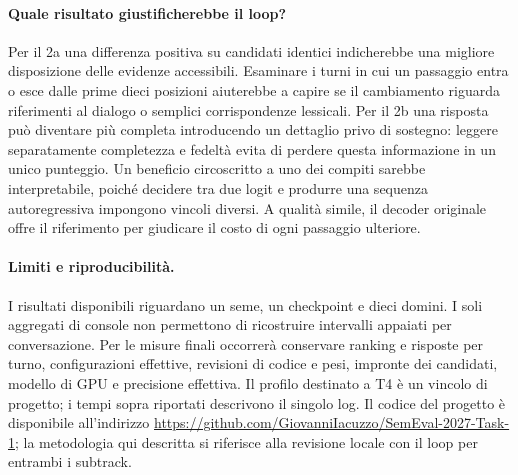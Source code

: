 \paragraph{Quale risultato giustificherebbe il loop?}
Per il 2a una differenza positiva su candidati identici indicherebbe una migliore disposizione delle evidenze accessibili. Esaminare i turni in cui un passaggio entra o esce dalle prime dieci posizioni aiuterebbe a capire se il cambiamento riguarda riferimenti al dialogo o semplici corrispondenze lessicali. Per il 2b una risposta può diventare più completa introducendo un dettaglio privo di sostegno: leggere separatamente completezza e fedeltà evita di perdere questa informazione in un unico punteggio. Un beneficio circoscritto a uno dei compiti sarebbe interpretabile, poiché decidere tra due logit e produrre una sequenza autoregressiva impongono vincoli diversi. A qualità simile, il decoder originale offre il riferimento per giudicare il costo di ogni passaggio ulteriore.

\paragraph{Limiti e riproducibilità.}
I risultati disponibili riguardano un seme, un checkpoint e dieci domini. I soli aggregati di console non permettono di ricostruire intervalli appaiati per conversazione. Per le misure finali occorrerà conservare ranking e risposte per turno, configurazioni effettive, revisioni di codice e pesi, impronte dei candidati, modello di GPU e precisione effettiva. Il profilo destinato a T4 è un vincolo di progetto; i tempi sopra riportati descrivono il singolo log. Il codice del progetto è disponibile all'indirizzo \url{https://github.com/GiovanniIacuzzo/SemEval-2027-Task-1}; la metodologia qui descritta si riferisce alla revisione locale con il loop per entrambi i subtrack.
